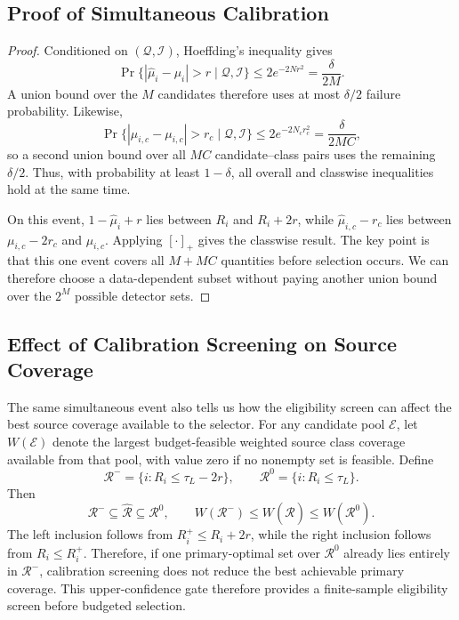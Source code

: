 \documentclass[conference]{IEEEtran}
\theoremstyle{definition}
\begin{document}
\subsection{Proof of Simultaneous Calibration}
\label{app:proof_calibration}
\begin{proof}
Conditioned on $(\mathcal Q,\mathcal I)$, Hoeffding's inequality gives
\[
\Pr\{|\widehat\mu_i-\mu_i|>r\mid\mathcal Q,\mathcal I\}
\le2e^{-2Nr^2}=\frac{\delta}{2M}.
\]
A union bound over the $M$ candidates therefore uses at most $\delta/2$ failure probability.
Likewise,
\[
\Pr\{|\widehat\mu_{i,c}-\mu_{i,c}|>r_c\mid\mathcal Q,\mathcal I\}
\le2e^{-2N_cr_c^2}=\frac{\delta}{2MC},
\]
so a second union bound over all $MC$ candidate--class pairs uses the remaining $\delta/2$.
Thus, with probability at least $1-\delta$, all overall and classwise inequalities hold at the same time.

On this event, $1-\widehat\mu_i+r$ lies between $R_i$ and $R_i+2r$, while $\widehat\mu_{i,c}-r_c$ lies between $\mu_{i,c}-2r_c$ and $\mu_{i,c}$.
Applying $[\cdot]_+$ gives the classwise result.
The key point is that this one event covers all $M+MC$ quantities before selection occurs.
We can therefore choose a data-dependent subset without paying another union bound over the $2^M$ possible detector sets.
\end{proof}

\subsection{Effect of Calibration Screening on Source Coverage}
\label{app:screening_coverage}
The same simultaneous event also tells us how the eligibility screen can affect the best source coverage available to the selector.
For any candidate pool $\mathcal E$, let $W(\mathcal E)$ denote the largest budget-feasible weighted source class coverage available from that pool, with value zero if no nonempty set is feasible.
Define
\begin{equation}
\mathcal R^-=\{i:R_i\le\tau_L-2r\},
\qquad
\mathcal R^0=\{i:R_i\le\tau_L\}.
\end{equation}
Then
\begin{equation}
\mathcal R^-\subseteq\widehat{\mathcal R}\subseteq\mathcal R^0,
\qquad
W(\mathcal R^-)\le W(\widehat{\mathcal R})\le W(\mathcal R^0).
\label{eq:coverage_sandwich}
\end{equation}
The left inclusion follows from $R_i^+\le R_i+2r$, while the right inclusion follows from $R_i\le R_i^+$.
Therefore, if one primary-optimal set over $\mathcal R^0$ already lies entirely in $\mathcal R^-$, calibration screening does not reduce the best achievable primary coverage.
This upper-confidence gate therefore provides a finite-sample eligibility screen before budgeted selection.
\end{document}
